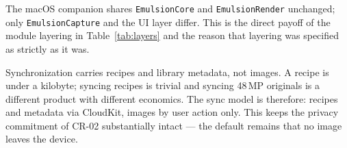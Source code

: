 The macOS companion shares \texttt{EmulsionCore} and \texttt{EmulsionRender}
unchanged; only \texttt{EmulsionCapture} and the UI layer differ. This is the
direct payoff of the module layering in Table~\ref{tab:layers} and the reason
that layering was specified as strictly as it was.

Synchronization carries recipes and library metadata, not images. A recipe is
under a kilobyte; syncing recipes is trivial and syncing 48\,MP originals is a
different product with different economics. The sync model is therefore:
recipes and metadata via CloudKit, images by user action only. This keeps the
privacy commitment of CR-02 substantially intact --- the default remains that
no image leaves the device.
